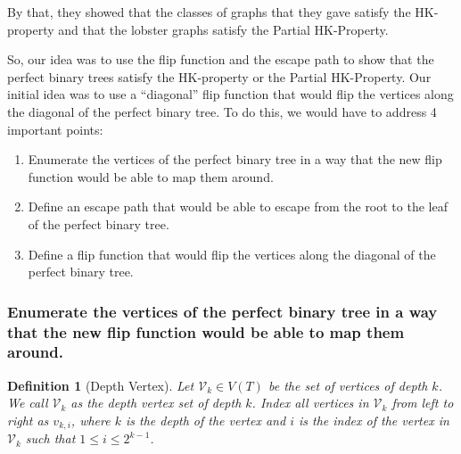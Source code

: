 \documentclass[11pt,a4paper]{article}
\newtheorem{definition}[theorem]{Definition}
\theoremstyle{definition}
\begin{document}
By that, they showed that the classes of graphs that they gave satisfy the HK-property and that the lobster graphs satisfy the Partial HK-Property.

So, our idea was to use the flip function and the escape path to show that the perfect binary trees satisfy the HK-property or the Partial HK-Property. Our initial idea was to use a ``diagonal'' flip function that would flip the vertices along the diagonal of the perfect binary tree. To do this, we would have to address 4 important points:

\begin{enumerate}
	\item Enumerate the vertices of the perfect binary tree in a way that the new flip function would be able to map them around.
	\item Define an escape path that would be able to escape from the root to the leaf of the perfect binary tree.
	\item Define a flip function that would flip the vertices along the diagonal of the perfect binary tree.
\end{enumerate}

\subsubsection*{Enumerate the vertices of the perfect binary tree in a way that the new flip function would be able to map them around.}

\begin{definition}[Depth Vertex]
	Let $\mathcal{V}_k \in V(T)$ be the set of vertices of depth $k$. We call $\mathcal{V}_k$ as the depth vertex set of depth $k$. Index all vertices in $\mathcal{V}_k$ from left to right as $v_{k, i}$, where $k$ is the depth of the vertex and $i$ is the index of the vertex in $\mathcal{V}_k$ such that $1 \leq i \leq 2^{k - 1}$.
\end{definition}
\end{document}
